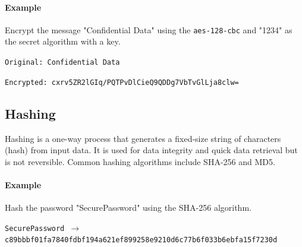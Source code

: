\documentclass{article}
\def\c#1{\texttt{#1}}
\begin{document}
\paragraph{Example}

Encrypt the message "Confidential Data" using the \c{aes-128-cbc} and "1234" as the secret algorithm with a key.

\texttt{Original: Confidential Data}

\texttt{Encrypted: cxrv5ZR2lGIq/PQTPvDlCieQ9QDDg7VbTvGlLja8clw=}

\subsection{Hashing}

Hashing is a one-way process that generates a fixed-size string of characters (hash) from input data. It is used for data integrity and quick data retrieval but is not reversible. Common hashing algorithms include SHA-256 and MD5.

\paragraph{Example}

Hash the password "SecurePassword" using the SHA-256 algorithm.

\texttt{SecurePassword $\rightarrow$ c89bbbf01fa7840fdbf194a621ef899258e9210d6c77b6f033b6ebfa15f7230d}
\end{document}
